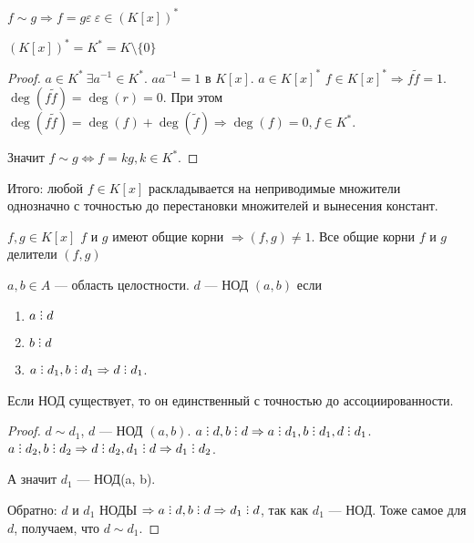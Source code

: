 $f \sim g \Rightarrow f = g\varepsilon\ \varepsilon\in (K[x])^*$
 \begin{lemma}
     $(K[x])^* = K^* = K \setminus \{0\}$
\end{lemma}
\begin{proof}
    $a \in K^*\ \exists a^{-1} \in K^*$.  $a a^{-1} = 1$ в  $K[x]$.  $a \in K[x]^*$ $f \in K[x]^* \Rightarrow f \widetilde{f} = 1$.  $\deg (f \widetilde{f}) = \deg(r) = 0$. При этом  $\deg (f\widetilde{f}) = \deg (f) + \deg(\widetilde{f}) \Rightarrow \deg(f) = 0, f \in K^*$.

    Значит $f \sim g \iff f = kg, k \in K^*$.
\end{proof}
\slashn
Итого: любой $f \in K[x]$ раскладывается на неприводимые множители однозначно с точностью до перестановки множителей и вынесения констант.
 \begin{consequence}
     $f, g \in K[x]$  $f$ и  $g$ имеют общие корни  $\Rightarrow (f, g) \neq 1$. Все общие корни  $f$ и  $g$ делители  $(f, g)$
\end{consequence}
\begin{definition}
    $a, b \in A$ --- область целостности.  $d$ --- НОД $(a, b)$ если
    \begin{enumerate}
        \item $a \divby d$
        \item  $b \divby d$
        \item  $a \divby d_1, b \divby d_1 \Rightarrow d \divby d_1$.
    \end{enumerate}
\end{definition}
\begin{statement}
    Если НОД существует, то он единственный с точностью до ассоциированности.
\end{statement}
\begin{proof}
    $d \sim d_1$,  $d$ --- НОД $(a,b)$.  $a \divby d, b \divby d \Rightarrow a \divby d_1, b \divby d_1, d \divby d_1$. $a \divby d_2, b \divby d_2 \Rightarrow d  \divby d_2, d_1 \divby d \Rightarrow d_1 \divby d_2$. 

    А значит $d_1$ --- НОД(a, b).

    Обратно: $d$ и $d_1$ НОДЫ $\Rightarrow a \divby d, b \divby d \Rightarrow d_1 \divby d$, так как  $d_1$ --- НОД. Тоже самое для $d$, получаем, что  $d \sim d_1$.
\end{proof}

